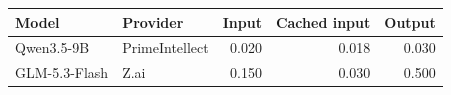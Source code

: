 \begin{tabular}{llrrr}
\toprule
Model & Provider & Input & Cached input & Output \\
\midrule
Qwen3.5-9B & PrimeIntellect & 0.020 & 0.018 & 0.030 \\
GLM-5.3-Flash & Z.ai & 0.150 & 0.030 & 0.500 \\
\bottomrule
\end{tabular}
